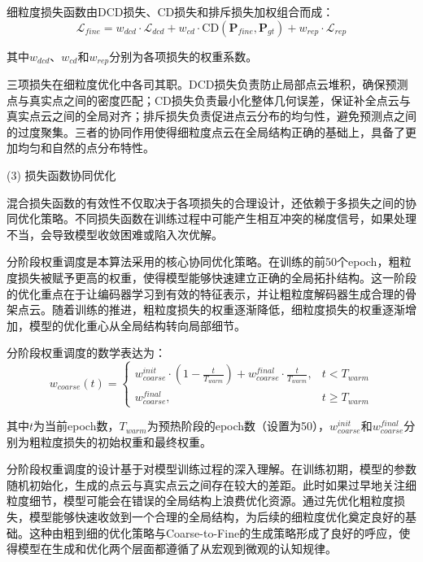 细粒度损失函数由DCD损失、CD损失和排斥损失加权组合而成：
\begin{equation}
\mathcal{L}_{fine} = w_{dcd} \cdot \mathcal{L}_{dcd} + w_{cd} \cdot \text{CD}(\mathbf{P}_{fine}, \mathbf{P}_{gt}) + w_{rep} \cdot \mathcal{L}_{rep}
\end{equation}

其中$w_{dcd}$、$w_{cd}$和$w_{rep}$分别为各项损失的权重系数。

三项损失在细粒度优化中各司其职。DCD损失负责防止局部点云堆积，确保预测点与真实点之间的密度匹配；CD损失负责最小化整体几何误差，保证补全点云与真实点云之间的全局对齐；排斥损失负责促进点云分布的均匀性，避免预测点之间的过度聚集。三者的协同作用使得细粒度点云在全局结构正确的基础上，具备了更加均匀和自然的点分布特性。

(3) 损失函数协同优化

混合损失函数的有效性不仅取决于各项损失的合理设计，还依赖于多损失之间的协同优化策略。不同损失函数在训练过程中可能产生相互冲突的梯度信号，如果处理不当，会导致模型收敛困难或陷入次优解。

分阶段权重调度是本算法采用的核心协同优化策略。在训练的前50个epoch，粗粒度损失被赋予更高的权重，使得模型能够快速建立正确的全局拓扑结构。这一阶段的优化重点在于让编码器学习到有效的特征表示，并让粗粒度解码器生成合理的骨架点云。随着训练的推进，粗粒度损失的权重逐渐降低，细粒度损失的权重逐渐增加，模型的优化重心从全局结构转向局部细节。

分阶段权重调度的数学表达为：
\begin{equation}
w_{coarse}(t) = \begin{cases}
w_{coarse}^{init} \cdot \left(1 - \frac{t}{T_{warm}}\right) + w_{coarse}^{final} \cdot \frac{t}{T_{warm}}, & t < T_{warm} \\
w_{coarse}^{final}, & t \geq T_{warm}
\end{cases}
\end{equation}

其中$t$为当前epoch数，$T_{warm}$为预热阶段的epoch数（设置为50），$w_{coarse}^{init}$和$w_{coarse}^{final}$分别为粗粒度损失的初始权重和最终权重。

分阶段权重调度的设计基于对模型训练过程的深入理解。在训练初期，模型的参数随机初始化，生成的点云与真实点云之间存在较大的差距。此时如果过早地关注细粒度细节，模型可能会在错误的全局结构上浪费优化资源。通过先优化粗粒度损失，模型能够快速收敛到一个合理的全局结构，为后续的细粒度优化奠定良好的基础。这种由粗到细的优化策略与Coarse-to-Fine的生成策略形成了良好的呼应，使得模型在生成和优化两个层面都遵循了从宏观到微观的认知规律。

